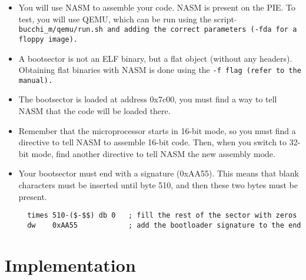 \begin{itemize}
\item
  You will use NASM to assemble your code. NASM is present on the
  PIE. To test, you will use QEMU, which can be run using the script
  \tt $\tilde{}$bucchi\_m/qemu/run.sh \rm and adding the correct parameters
  (\tt -fda \rm for a floppy image).
\item
  A bootsector is not an ELF binary, but a flat object (without any
  headers). Obtaining flat binaries with NASM is done using the \tt -f \rm
  flag (refer to the manual).
\item
  The bootsector is loaded at address 0x7c00, you must find a way to
  tell NASM that the code will be loaded there.
\item
  Remember that the microprocessor starts in 16-bit mode, so you must
  find a directive to tell NASM to assemble 16-bit code. Then, when
  you switch to 32-bit mode, find another directive to tell NASM the
  new assembly mode.
\item
  Your bootsector must end with a signature (0xAA55). This means that
  blank characters must be inserted until byte 510, and then these two
  bytes must be present.
  \begin{verbatim}
  times 510-($-$$) db 0	  ; fill the rest of the sector with zeros
  dw    0xAA55            ; add the bootloader signature to the end
  \end{verbatim}
\end{itemize}

\newpage

\section*{Implementation}

